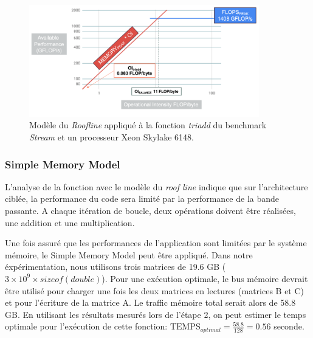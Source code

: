 \begin{figure}
    \center
    \includegraphics[width=10cm]{images/roofline_stream.png}
    \caption{\label{pic:roofline_stream} Modèle du \textit{Roofline} appliqué à la fonction \textit{triadd} du benchmark \textit{Stream} et un processeur Xeon Skylake 6148.}
\end{figure}



\subsubsection{Simple Memory Model} 
L'analyse de la fonction avec le modèle du \textit{roof line} indique que sur l'architecture ciblée, la performance du code sera limité par la performance de la bande passante.
A chaque itération de boucle, deux opérations doivent être réalisées, une addition et une multiplication. 

Une fois assuré que les performances de l'application sont limitées par le système mémoire, le Simple Memory Model peut être appliqué. Dans notre éxpérimentation, nous utilisons trois matrices de 19.6 GB ($3 \times 10^9 \times sizeof(double)$). Pour une exécution optimale, le bus mémoire devrait être utilisé pour charger une fois les deux matrices en lectures (matrices B et C)  et pour l'écriture de la matrice A. Le traffic mémoire total serait alors de 58.8 GB. En utilisant les résultats mesurés lors de l'étape 2, on peut estimer le temps optimale pour l'exécution de cette fonction: $\text{TEMPS}_{optimal} = \frac{58.8}{128} = 0.56$ seconde.










